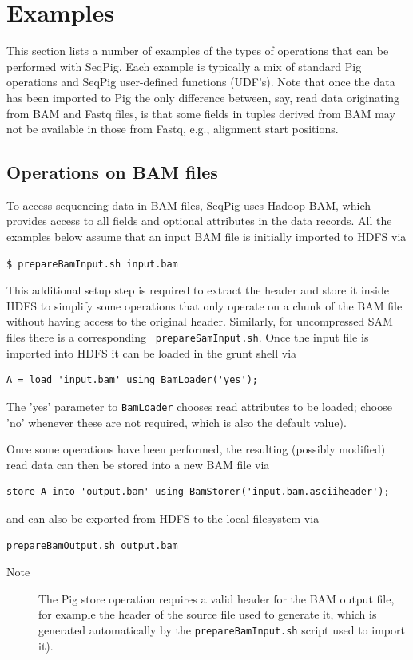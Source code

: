 
\section{Examples}
\label{sect:examples}

This section lists a number of examples of the types of operations
that can be performed with SeqPig. Each example is typically a mix of
standard Pig operations and SeqPig user-defined functions (UDF's).
Note that once the data has been imported to Pig the only difference
between, say, read data originating from BAM and Fastq files, is that
some fields in tuples derived from BAM may not be available in those
from Fastq, e.g., alignment start positions.

\subsection{Operations on BAM files}

To access sequencing data in BAM files, SeqPig uses Hadoop-BAM, which
provides access to all fields and optional attributes in the data
records. All the examples below assume that an input BAM file is
initially imported to HDFS via
\begin{lstlisting} 
$ prepareBamInput.sh input.bam
\end{lstlisting} 
This additional setup step is required to extract the header and store
it inside HDFS to simplify some operations that only operate on a
chunk of the BAM file without having access to the original header.
Similarly, for uncompressed SAM files there is a corresponding {\tt
prepareSamInput.sh}. Once the input file is imported into HDFS it
can be loaded in the grunt shell via
\begin{lstlisting} 
A = load 'input.bam' using BamLoader('yes');
\end{lstlisting} 
The 'yes' parameter to {\tt BamLoader} chooses read attributes to be
loaded; choose 'no' whenever these are not required, which is
also the default value).

Once some operations have been performed, the resulting (possibly
modified) read data can then be stored into a new BAM file via
\begin{lstlisting}
store A into 'output.bam' using BamStorer('input.bam.asciiheader');
\end{lstlisting}
and can also be exported from HDFS to the local filesystem via
\begin{lstlisting}
prepareBamOutput.sh output.bam
\end{lstlisting}
\begin{description}
	\item[Note] The Pig store operation requires a valid header for the BAM output file,
for example the header of the source file used to generate it, which is
generated automatically by the {\tt prepareBamInput.sh} script used to import it).
\end{description}

